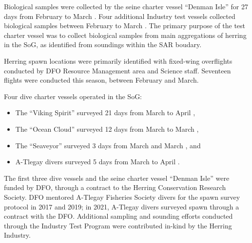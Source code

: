 Biological samples were collected by the seine charter vessel ``Denman Isle''
for 27 days from February  to March .
Four additional Industry test vessels collected biological samples
between February  to March .
The primary purpose of the test charter vessel was to
collect biological samples from main aggregations of herring in the SoG,
as identified from soundings within the SAR boudary. 

Herring spawn locations were primarily identified with fixed-wing overflights
conducted by DFO Resource Management area and Science staff.
Seventeen flights were conducted this season, between February and March.

Four dive charter vessels operated in the SoG:
\begin{itemize}
\item The ``Viking Spirit'' surveyed 21 days from March  to April ,
\item The ``Ocean Cloud'' surveyed 12 days from March  to March ,
\item The ``Seaveyor'' surveyed 3 days from March  and March , and
\item A-Tlegay divers surveyed 5 days from March  to April .
\end{itemize}
The first three dive vessels and the seine charter vessel ``Denman Isle''
were funded by DFO, through a contract to the Herring Conservation Research Society.
DFO mentored A-Tlegay Fisheries Society divers for the spawn survey protocol in 2017 and 2019;
in 2021, A-Tlegay divers surveyed spawn through a contract with the DFO.
Additional sampling and sounding efforts conducted through the
Industry Test Program were contributed in-kind by the Herring Industry.
